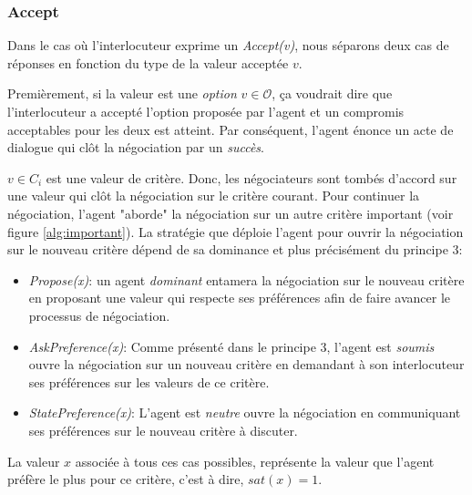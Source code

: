 	
	\subsubsection{Accept}
		
		Dans le cas où l'interlocuteur exprime un \emph{Accept(v)}, nous séparons deux cas de réponses en fonction du type de la valeur acceptée $v$.
		
		Premièrement, si la valeur est une \textit{option} $ v \in \mathcal{O}$, ça voudrait dire que l'interlocuteur a accepté l'option proposée par l'agent et un compromis acceptables pour les deux est atteint. Par conséquent, l'agent énonce un acte de dialogue qui clôt la négociation par un \emph{succès}.
		
		$v \in C_i$ est une valeur de critère. Donc, les négociateurs sont tombés d'accord sur une valeur qui clôt la négociation sur le critère courant. Pour continuer la négociation, l'agent "aborde" la négociation sur un autre critère important (voir figure \ref{alg:important}). La stratégie que déploie l'agent pour ouvrir la négociation sur le nouveau critère dépend de sa dominance et plus précisément du principe 3:
		
		\begin{itemize}   \item \emph{Propose(x)}: un agent \emph{dominant} entamera la négociation sur le nouveau critère en proposant une valeur qui respecte ses préférences afin de faire avancer le processus de négociation. 
			
			\item \emph{AskPreference(x)}: Comme présenté dans le principe 3, l'agent est \emph{soumis} ouvre la négociation sur un nouveau critère en demandant à son interlocuteur ses préférences sur les valeurs de ce critère.
			
			\item \emph{StatePreference(x)}: L'agent est \emph{neutre} ouvre la négociation en communiquant ses préférences sur le nouveau critère à discuter. 
			
		\end{itemize}
		
		La valeur $x$ associée à tous ces cas possibles, représente la valeur que l'agent préfère le plus pour ce critère, c'est à dire, $sat(x) =1$.


